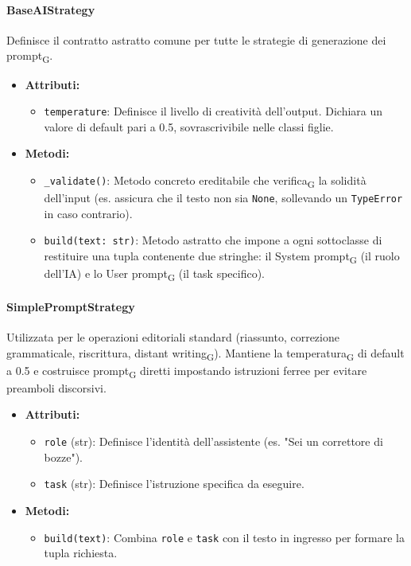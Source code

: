 \documentclass[11pt,a4paper]{article}
\newcommand{\gls}[1]{#1\textsubscript{G}}
\begin{document}
\paragraph{BaseAIStrategy}
Definisce il contratto astratto comune per tutte le strategie di generazione dei \gls{prompt}.
\begin{itemize}
    \item\textbf{Attributi:}
\begin{itemize}
    \item \texttt{temperature}: Definisce il livello di creatività dell'output. Dichiara un valore di default pari a 0.5, sovrascrivibile nelle classi figlie.
\end{itemize}
    \item \textbf{Metodi:}
\begin{itemize}
    \item \texttt{\_validate()}: Metodo concreto ereditabile che \gls{verifica} la solidità dell'input (es. assicura che il testo non sia \texttt{None}, sollevando un \texttt{TypeError} in caso contrario).
    \item \texttt{build(text: str)}: Metodo astratto che impone a ogni sottoclasse di restituire una tupla contenente due stringhe: il \gls{System prompt} (il ruolo dell'IA) e lo \gls{User prompt} (il task specifico).
\end{itemize}
\end{itemize}

\paragraph{SimplePromptStrategy}
Utilizzata per le operazioni editoriali standard (riassunto, correzione grammaticale, riscrittura, \gls{distant writing}). Mantiene la \gls{temperatura} di default a 0.5 e costruisce \gls{prompt} diretti impostando istruzioni ferree per evitare preamboli discorsivi.
\begin{itemize}
    \item\textbf{Attributi:}
\begin{itemize}
    \item \texttt{role} (str): Definisce l'identità dell'assistente (es. "Sei un correttore di bozze").
    \item \texttt{task} (str): Definisce l'istruzione specifica da eseguire.
\end{itemize}
    \item\textbf{Metodi:}
\begin{itemize}
    \item \texttt{build(text)}: Combina \texttt{role} e \texttt{task} con il testo in ingresso per formare la tupla richiesta.
\end{itemize}
\end{itemize}
\end{document}
